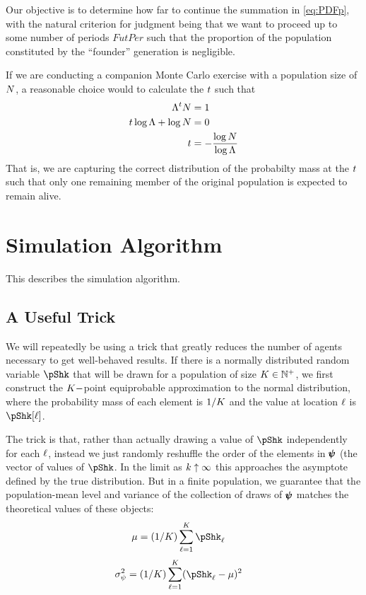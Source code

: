 \documentclass[\econtexRoot/BufferStockTheory.tex]{subfiles}
\begin{document}
Our objective is to determine how far to continue the summation in \eqref{eq:PDFp}, with the natural criterion for judgment being that we want to proceed up to some number of periods $FutPer$ such that the proportion of the population constituted by the ``founder'' generation is negligible.

If we are conducting a companion Monte Carlo exercise with a population size of $N$, a reasonable choice would to calculate the $t$ such that
\begin{align*}
  \Lambda^{t}N & = 1 
  \\  t \log \Lambda + \log N & = 0
  \\  t  & = - \frac{\log N}{\log \Lambda}  \label{eq:lessThanOneLeft}
\end{align*}
That is, we are capturing the correct distribution of the probabilty mass at the $t$ such that only one remaining member of the original population is expected to remain alive.

\section{Simulation Algorithm}

This describes the simulation algorithm.

\subsection{A Useful Trick}

We will repeatedly be using a trick that greatly reduces the number of agents necessary to get well-behaved results.  If there is a normally distributed random variable $\pShk$ that will be drawn for a population of size $K \in \mathbb{N}^{+}$, we first construct the $K-$point equiprobable approximation to the normal distribution, where the probability mass of each element is $1/K$ and the value at location $\ell$ is $\pShk[\posn]$.

The trick is that, rather than actually drawing a value of $\pShk$ independently for each $\ell$, instead we just randomly reshuffle the order of the elements in $\pmb{\psi}$ (the vector of values of $\pShk$.  In the limit as $k \uparrow \infty$ this approaches the asymptote defined by the true distribution.  But in a finite population, we guarantee that the population-mean level and variance of the collection of draws of $\pmb{\psi}$ matches the theoretical values of these objects:
\begin{align}
  \mu & = (1/\Mass)\sum_{\posn=1}^{\Mass}\pShk_{\posn}
\end{align}
\begin{align}
  \sigma^{2}_{\DnsShk} & = (1/\Mass)\sum_{\posn=1}^{\Mass}(\pShk_{\posn} - \mu)^{2}
\end{align}
\end{document}
